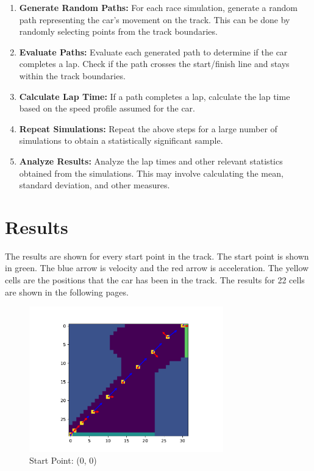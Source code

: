 \documentclass{article}
\begin{document}
\begin{enumerate}
	\item \textbf{Generate Random Paths:} For each race simulation, generate a random path representing the car's movement on the track. This can be done by randomly selecting points from the track boundaries.
	
	\item \textbf{Evaluate Paths:} Evaluate each generated path to determine if the car completes a lap. Check if the path crosses the start/finish line and stays within the track boundaries.
	
	\item \textbf{Calculate Lap Time:} If a path completes a lap, calculate the lap time based on the speed profile assumed for the car.
	
	\item \textbf{Repeat Simulations:} Repeat the above steps for a large number of simulations to obtain a statistically significant sample.
	
	\item \textbf{Analyze Results:} Analyze the lap times and other relevant statistics obtained from the simulations. This may involve calculating the mean, standard deviation, and other measures.
	
\end{enumerate}

\section{Results}
The results are shown for every start point in the track. The start point is shown in green. The blue arrow is velocity and the red arrow is acceleration. The yellow cells are the positions that the car has been in the track. The results for 22 cells are shown in the following pages.

\begin{figure}[H]
	\centering
	\includegraphics[width=0.75\textwidth]{../figure/fig_0}
	\caption{Start Point: (0, 0)}
	\label{fig:fig_0}
\end{figure}
\end{document}
